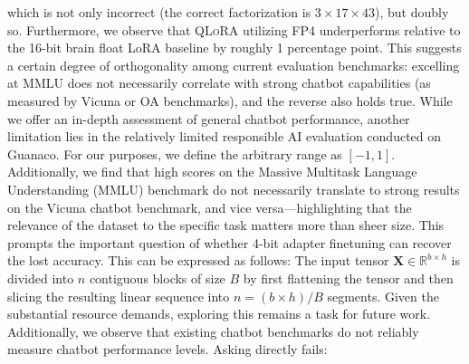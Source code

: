 which is not only incorrect (the correct factorization is $3 \times 17 \times 43$), but doubly so. Furthermore, we observe that \textsc{QLoRA} utilizing FP4 underperforms relative to the 16-bit brain float LoRA baseline by roughly 1 percentage point. This suggests a certain degree of orthogonality among current evaluation benchmarks: excelling at MMLU does not necessarily correlate with strong chatbot capabilities (as measured by Vicuna or OA benchmarks), and the reverse also holds true. While we offer an in-depth assessment of general chatbot performance, another limitation lies in the relatively limited responsible AI evaluation conducted on {Guanaco}. For our purposes, we define the arbitrary range as $[-1, 1]$. Additionally, we find that high scores on the Massive Multitask Language Understanding (MMLU) benchmark do not necessarily translate to strong results on the Vicuna chatbot benchmark, and vice versa—highlighting that the relevance of the dataset to the specific task matters more than sheer size. This prompts the important question of whether 4-bit adapter finetuning can recover the lost accuracy. This can be expressed as follows: The input tensor $\mathbf{X}\in \mathbb{R}^{b\times h}$ is divided into $n$ contiguous blocks of size $B$ by first flattening the tensor and then slicing the resulting linear sequence into ${n = ({b\times h} )/{B} }$ segments. Given the substantial resource demands, exploring this remains a task for future work. Additionally, we observe that existing chatbot benchmarks do not reliably measure chatbot performance levels. Asking directly fails:

